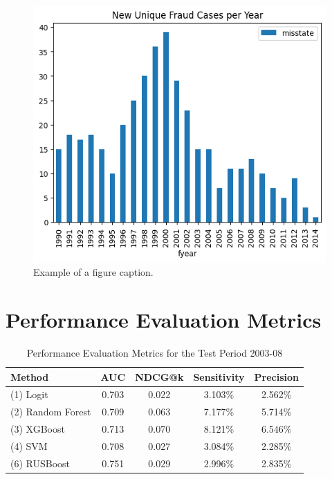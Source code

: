 \documentclass[conference]{IEEEtran}
\begin{document}
\begin{figure}[htbp]
\centerline{\includegraphics[width=\columnwidth]{unique_fraud}}
\caption{Example of a figure caption.}
\label{fig}
\end{figure}

\section{Performance Evaluation Metrics}

\begin{table}[htbp]
\caption{Performance Evaluation Metrics for the Test Period 2003-08}
\centering
\begin{tabular}{p{2.495cm}cccc}
\toprule
\textbf{Method} & \textbf{AUC} & \textbf{NDCG@k} & \textbf{Sensitivity} & \textbf{Precision} \\
\midrule
\raggedright (1) Logit & 0.703 & 0.022 & 3.103\% & 2.562\% \\
\raggedright (2) Random Forest & 0.709 & 0.063 & 7.177\% & 5.714\% \\
\raggedright (3) XGBoost & 0.713 & 0.070 & 8.121\% & 6.546\% \\
\raggedright (4) SVM & 0.708 & 0.027 & 3.084\% & 2.285\% \\
\raggedright (6) RUSBoost & 0.751 & 0.029 & 2.996\% & 2.835\% \\
\bottomrule
\end{tabular}
\end{table}
\end{document}
